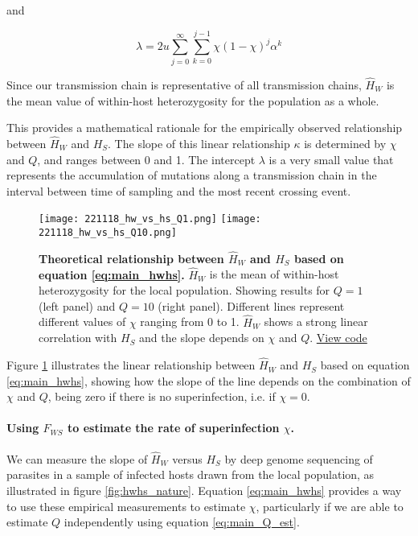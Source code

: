 \documentclass[_main.tex]{subfiles}
\begin{document}
and

\begin{equation*}
\lambda = 2u \sum_{j=0}^\infty \sum_{k=0}^{j-1}  \chi (1- \chi)^j \alpha^k
\end{equation*}

Since our transmission chain is representative of all transmission chains, $\widehat{H}_W$ is the mean value of within-host heterozygosity for the population as a whole.

This provides a mathematical rationale for the empirically observed relationship between $\widehat{H}_W$ and $H_S$.   The slope of this linear relationship $\kappa$ is determined by $\chi$ and $Q$, and ranges between 0 and 1.  The intercept $\lambda$ is a very small value that represents the accumulation of mutations along a transmission chain in the interval between time of sampling and the most recent crossing event.

\begin{figure}[h!]
\centering
\texttt{[image: 221118\_hw\_vs\_hs\_Q1.png]}
\texttt{[image: 221118\_hw\_vs\_hs\_Q10.png]}
\caption{\textbf{Theoretical relationship between $\widehat{H}_W$ and $H_S$ based on equation \ref{eq:main_hwhs}.}  $\widehat{H}_W$ is the mean of within-host heterozygosity for the local population.  Showing results for $Q = 1$ (left panel) and $Q = 10$ (right panel).  Different lines represent different values of $\chi$ ranging from 0 to 1.  $\widehat{H}_W$ shows a strong linear correlation with $H_S$ and the slope depends on $\chi$ and $Q$.
\href{https://github.com/d-kwiat/gtg/blob/main/hw_vs_hs.ipynb}{View code}
}
\label{fig:hw_vs_hs_model}
\end{figure}

Figure \ref{fig:hw_vs_hs_model} illustrates the linear relationship between $\widehat{H}_W$ and $H_S$ based on equation \ref{eq:main_hwhs}, showing how the slope of the line depends on the combination of $\chi$ and $Q$, being zero if there is no superinfection, i.e. if $\chi = 0$. 


\paragraph{Using $F_{WS}$ to estimate the rate of superinfection $\chi$.}

We can measure the slope of $\widehat{H}_W$ versus $H_S$ by deep genome sequencing of parasites in a sample of infected hosts drawn from the local population, as illustrated in figure \ref{fig:hwhs_nature}.  Equation \ref{eq:main_hwhs} provides a way to use these empirical measurements to estimate $\chi$, particularly if we are able to estimate $Q$ independently using equation \ref{eq:main_Q_est}.
\end{document}
